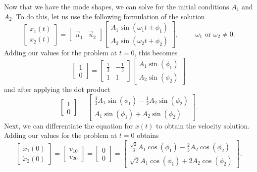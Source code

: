 \documentclass[12pt,letter]{article}
\begin{document}
\begin{example}
Now that we have the mode shapes, we can solve for the initial conditions $A_1$ and $A_2$. To do this, let us use the following formulation of the solution
\begin{equation}
 \begin{bmatrix} x_1(t) \\  x_2(t) \end{bmatrix} =  \begin{bmatrix} \vec{u}_1 & \vec{u}_2 \end{bmatrix}
 \begin{bmatrix} A_1 \sin (\omega_1 t + \phi_1 )\\ A_2 \sin (\omega_2 t + \phi_2 )\end{bmatrix}, \hspace{1cm} \omega_1 \text{ or } \omega_2 \neq 0.
\end{equation}
Adding our values for the problem at $t=0$, this becomes
\begin{equation}
 \begin{bmatrix} 1 \\  0 \end{bmatrix} =  \begin{bmatrix} \frac{1}{3} & -\frac{1}{3} \\ 1 & 1 \end{bmatrix}
 \begin{bmatrix} A_1 \sin (\phi_1)\\ A_2 \sin (\phi_2)\end{bmatrix}
\end{equation}
and after applying the dot product
\begin{equation}
 \begin{bmatrix} 1 \\  0 \end{bmatrix} =  \begin{bmatrix} \frac{1}{3}A_1 \sin (\phi_1 ) -\frac{1}{3}A_2 \sin (\phi_2)\\ A_1 \sin (\phi_1 )+A_2 \sin (\phi_2 )\end{bmatrix}.
\end{equation}
Next, we can differentiate the equation for $x(t)$ to obtain the velocity solution. Adding our values for the problem at $t=0$ obtains
\begin{equation}
 \begin{bmatrix} \dot{x}_1(0) \\  \dot{x}_2(0) \end{bmatrix}  = \begin{bmatrix} v_{10} \\  v_{20} \end{bmatrix} = \begin{bmatrix} 0 \\  0 \end{bmatrix} =   \begin{bmatrix} \frac{\sqrt{2}}{3}A_1 \cos (\phi_1 ) -\frac{2}{3}A_2 \cos (\phi_2)\\ \sqrt{2}A_1 \cos (\phi_1 )+2 A_2 \cos (\phi_2 )\end{bmatrix}.

\end{equation}
\end{example}
\end{document}
